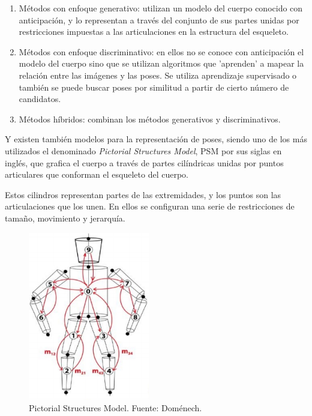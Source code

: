 \documentclass[a4paper,12pt,oneside,spanish]{book}
\begin{document}
\begin{enumerate}
	\baselineskip 16pt
	\item Métodos con enfoque generativo: utilizan un modelo del cuerpo conocido con anticipación, y lo representan a través del conjunto de sus partes unidas por restricciones impuestas a las articulaciones en la estructura del esqueleto.\par
	\item Métodos con enfoque discriminativo: en ellos no se conoce con anticipación el modelo del cuerpo sino que se utilizan algoritmos que 'aprenden' a mapear la relación entre las imágenes y las poses. Se utiliza aprendizaje supervisado o también se puede buscar poses por similitud a partir de cierto número de candidatos.\par
	\item Métodos híbridos: combinan los métodos generativos y discriminativos. \par
\end{enumerate}

Y existen también modelos para la representación de poses, siendo uno de los más utilizados el denominado \textit{Pictorial Structures Model}, PSM por sus siglas en inglés, que grafica el cuerpo a través de partes cilíndricas unidas por puntos articulares que conforman el esqueleto del cuerpo. \par
 
Estos cilindros representan partes de las extremidades, y los puntos son las articulaciones que los unen. En ellos se configuran una serie de restricciones de tamaño, movimiento y jerarquía.

\begin{figure}[h!]
	\includegraphics[width=150pt]{Imagenes/domenech1.jpg}
	\centering
	\caption{Pictorial Structures Model. Fuente: Doménech.}
	\label{fig:domenech2}
\end{figure}
\end{document}
